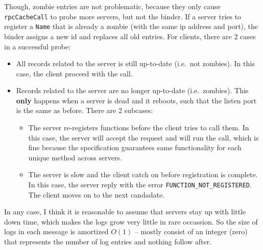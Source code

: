 Though, zombie entries are not problematic, because they only cause {\tt rpcCacheCall} to probe more servers, but not the binder.
If a server tries to register a {\tt Name} that is already a zombie (with the same ip address and port), the binder assigns a new id and replaces all old entries.
For clients, there are 2 cases in a successful probe:
\begin{itemize}
\item
All records related to the server is still up-to-date (i.e.\ not zombies).
In this case, the client proceed with the call.
\item
Records related to the server are no longer up-to-date (i.e.\ zombies).
This {\bf only} happens when a server is dead and it reboots, such that the listen port is the same as before.
There are 2 subcases:
\begin{itemize}
\item
The server re-registers functions before the client tries to call them.
In this case, the server will accept the request and will run the call, which is fine because the specification guarantees same functionality for each unique method across servers.
\item
The server is slow and the client catch on before registration is complete.
In this case, the server reply with the error {\tt FUNCTION\_NOT\_REGISTERED}.
The client moves on to the next candadate.
\end{itemize}
\end{itemize}

In any case, I think it is reasonable to assume that servers stay up with little down time, which makes the logs grow very little in rare occassion. So the size of logs in each message is amortized $O(1)$ -- mostly consist of an integer (zero) that represents the number of log entries and nothing follow after.
